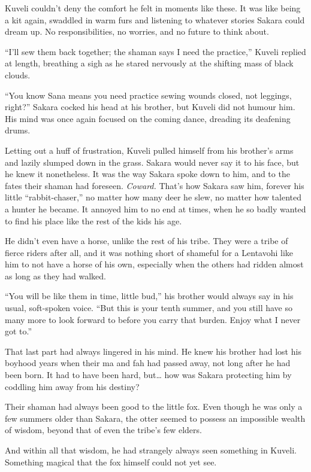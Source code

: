 Kuveli couldn't deny the comfort he felt in moments like these. It was like being a kit again, swaddled in warm furs and listening to whatever stories Sakara could dream up. No responsibilities, no worries, and no future to think about.

``I'll sew them back together; the shaman says I need the practice,'' Kuveli replied at length, breathing a sigh as he stared nervously at the shifting mass of black clouds.

``You know Sana means you need practice sewing wounds closed, not leggings, right?'' Sakara cocked his head at his brother, but Kuveli did not humour him. His mind was once again focused on the coming dance, dreading its deafening drums.

Letting out a huff of frustration, Kuveli pulled himself from his brother's arms and lazily slumped down in the grass. Sakara would never say it to his face, but he knew it nonetheless. It was the way Sakara spoke down to him, and to the fates their shaman had foreseen. \emph{Coward.} That's how Sakara saw him, forever his little ``rabbit-chaser,'' no matter how many deer he slew, no matter how talented a hunter he became. It annoyed him to no end at times, when he so badly wanted to find his place like the rest of the kids his age.

He didn't even have a horse, unlike the rest of his tribe. They were a tribe of fierce riders after all, and it was nothing short of shameful for a Lentavohi like him to not have a horse of his own, especially when the others had ridden almost as long as they had walked.

``You will be like them in time, little bud,'' his brother would always say in his usual, soft-spoken voice. ``But this is your tenth summer, and you still have so many more to look forward to before you carry that burden. Enjoy what I never got to.''

That last part had always lingered in his mind. He knew his brother had lost his boyhood years when their ma and fah had passed away, not long after he had been born. It had to have been hard, but\ldots{} how was Sakara protecting him by coddling him away from his destiny?

Their shaman had always been good to the little fox. Even though he was only a few summers older than Sakara, the otter seemed to possess an impossible wealth of wisdom, beyond that of even the tribe's few elders.

And within all that wisdom, he had strangely always seen something in Kuveli. Something magical that the fox himself could not yet see.

